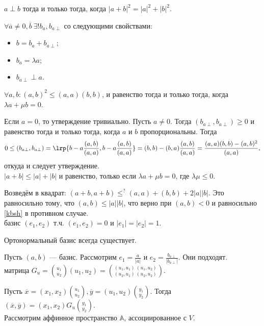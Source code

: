 \documentclass[12pt,a4paper]{article}
\begin{document}
 $a\perp b$ тогда и только тогда, когда $|a+b|^2=|a|^2+|b|^2$.

\lemma $\forall \overline{a}\neq 0,\overline{b}\ \exists! b_a,b_{a\perp}$ со следующими свойствами:

\begin{itemize}
	\item $b=b_a+b_{a\perp}$;
	\item $b_a=\lambda a$;
	\item $b_{a\perp}\perp a$.
\end{itemize}

 $\forall a,b:(a,b)^2\leq (a,a)(b,b)$, и равенство тогда и только тогда, когда $\lambda a+\mu b=0$.\label{kbsh}

\proof Если $a=0$, то утверждение тривиально. Пусть $a\neq 0$. Тогда $(b_{a\perp},b_{a\perp})\geq 0$ и равенство тогда и только тогда, когда $a$ и $b$ пропорциональны. Тогда \[
	0\leq (b_{a\perp},b_{a\perp})=\lrp{b-a\frac{(a,b)}{(a,a)},b-a\frac{(a,b)}{(a,a)}}=(b,b)-(b,a)\frac{(a,b)}{(a,a)}=\frac{(a,a)(b,b)-(a,b)^2}{(a,a)},
\] откуда и следует утверждение.\QEDA\\

 $|a+b|\leq |a|+|b|$ и равенство, только если $\lambda a+\mu b=0$, где $\lambda\mu\leq 0$.

\proof Возведём в квадрат: $(a+b,a+b)\leq^? (a,a)+(b,b)+2|a||b|$. Это равносильно тому, что $(a,b)\leq |a||b|$, что верно при $(a,b)<0$ и равносильно \ref{kbsh} в противном случае. \QEDA\\

 базис $(e_1,e_2)$ т.ч. $(e_1,e_2)=0$ и $|e_1|=|e_2|=1$.

\lemma Ортонормальный базис всегда существует.

\proof Пусть $(a,b)$ --- базис. Рассмотрим $e_1=\frac{a}{|a|}$ и $e_2=\frac{b_{a\perp}}{|b_{a\perp}|}$. Они подходят.\QEDA\\

 матрица $G_u=\binom{u_1}{u_2}(u_1,u_2)=\binom{(u_1,u_1)\ (u_1,u_2)}{(u_2,u_1)\ (u_2,u_2)}$.

\lemma Пусть $\overline{x}=(x_1,x_2)\binom{u_1}{u_2},\overline{y}=(u_1,u_2)\binom{y_1}{y_2}$. Тогда $(\overline{x},\overline{y})=(x_1,x_2)G_u\binom{y_1}{y_2}$.\\

Рассмотрим аффинное пространство $\mathbb A$, ассоциированное с $V$.
\end{document}
